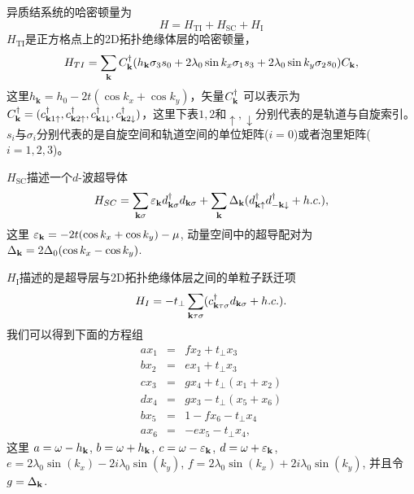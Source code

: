 异质结系统的哈密顿量为
\begin{equation}
H=H_\mathrm{TI}+H_\mathrm{SC}+H_\mathrm{I}
\end{equation}
$H_\mathrm{TI}$是正方格点上的2D拓扑绝缘体层的哈密顿量\cite{re56,re57}，
\begin{equation}
	\begin{aligned}
		H_{TI} =\sum_{{\bf k}}C_{{\bf k}}^\dagger (h_\mathbf{k}\sigma_3s_0+2\lambda_{0}\sin k_x\sigma_1s_3+2\lambda_0\sin k_y\sigma_2 s_0)C_{{\bf k}},
	\end{aligned}\label{tiham}
\end{equation}
这里$h_\mathbf{k}=h_0-2t(\cos k_x+\cos k_y)$，矢量$C^\dagger_{\bf k}$ 可以表示为$C^\dagger_{\bf k}=(c^\dagger_{{\bf k}1\uparrow},c^\dagger_{{\bf k}2\uparrow},c^\dagger_{{\bf k}1\downarrow},c^\dagger_{{\bf k}2\downarrow})$，这里下表$1,2$和$\uparrow,\downarrow$分别代表的是轨道与自旋索引。$s_i$与$\sigma_i$分别代表的是自旋空间和轨道空间的单位矩阵($i=0$)或者泡里矩阵($i=1,2,3$)。

$H_\mathrm{SC}$描述一个$d$-波超导体
\begin{equation}
	H_{SC}=\sum_{{\bf k}\sigma}\varepsilon_{\bf k}d^\dagger_{{\bf k}\sigma}d_{{\bf k}\sigma}+\sum_{{\bf k}}\Delta_{\bf k}(d^\dagger_{{\bf k}\uparrow}d^\dagger_{{-\bf k}\downarrow}+h.c.),
\end{equation}
这里 $\varepsilon_{\bf k}=-2t(\cos k_x+\cos k_y)-\mu$, 动量空间中的超导配对为 $\Delta_{\bf k}=2\Delta_0 (\cos k_x-\cos k_y)$.

\qquad $H_\mathrm{I}$描述的是超导层与2D拓扑绝缘体层之间的单粒子跃迁项
\begin{equation}
	H_{I}=-t_\perp \sum_{{\bf k}\tau\sigma}(c_{{\bf k}\tau\sigma}^\dagger d_{{\bf k}\sigma}+h.c.).
\end{equation}
我们可以得到下面的方程组
\begin{subequations}
	\begin{eqnarray}
		ax_1&=&fx_2+t_\perp x_3
		\\
		bx_2&=&ex_1+t_\perp x_3
		\\
		cx_3&=&gx_4+t_\perp (x_1+x_2)
		\\
		dx_4&=&gx_3-t_\perp (x_5+x_6)
		\\
		bx_5&=&1-fx_6-t_\perp x_4
		\\
		ax_6&=&-ex_5-t_\perp x_4,\label{eom2}
	\end{eqnarray}
\end{subequations}
这里 $a=\omega-h_{\bf k}$, $b=\omega + h_{\bf k}$, $c=\omega-\varepsilon_{\bf k}$,
$d=\omega+\varepsilon_{\bf k}$, $e=2\lambda_0\sin(k_x)-2i \lambda_0\sin(k_y)$, $f=2\lambda_0\sin(k_x) + 2i\lambda_0\sin(k_y)$,
并且令 $g = \Delta_{\bf k}$.

